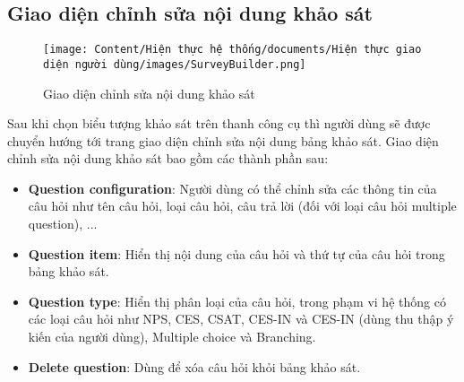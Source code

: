 \subsection{Giao diện chỉnh sửa nội dung khảo sát}

\begin{figure}[H]
    \centering
    \texttt{[image: Content/Hiện thực hệ thống/documents/Hiện thực giao diện người dùng/images/SurveyBuilder.png]}
    \vspace{0.5cm}
    \caption{Giao diện chỉnh sửa nội dung khảo sát}
    \label{fig: Giao diện chỉnh sửa nội dung khảo sát}
\end{figure}

Sau khi chọn biểu tượng khảo sát trên thanh công cụ thì người dùng sẽ được chuyển hướng tới trang giao diện chỉnh sửa nội dung bảng khảo sát. Giao diện chỉnh sửa nội dung khảo sát bao gồm các thành phần sau:

\begin{itemize}
    \item \textbf{Question configuration}: Người dùng có thể chỉnh sửa các thông tin của câu hỏi như tên câu hỏi, loại câu hỏi, câu trả lời (đối với loại câu hỏi multiple question), ...
    \item \textbf{Question item}: Hiển thị nội dung của câu hỏi và thứ tự của câu hỏi trong bảng khảo sát.
    \item \textbf{Question type}: Hiển thị phân loại của câu hỏi, trong phạm vi hệ thống có các loại câu hỏi như NPS, CES, CSAT, CES-IN và CES-IN (dùng thu thập ý kiến của người dùng), Multiple choice và Branching.
    \item \textbf{Delete question}: Dùng để xóa câu hỏi khỏi bảng khảo sát.
\end{itemize}